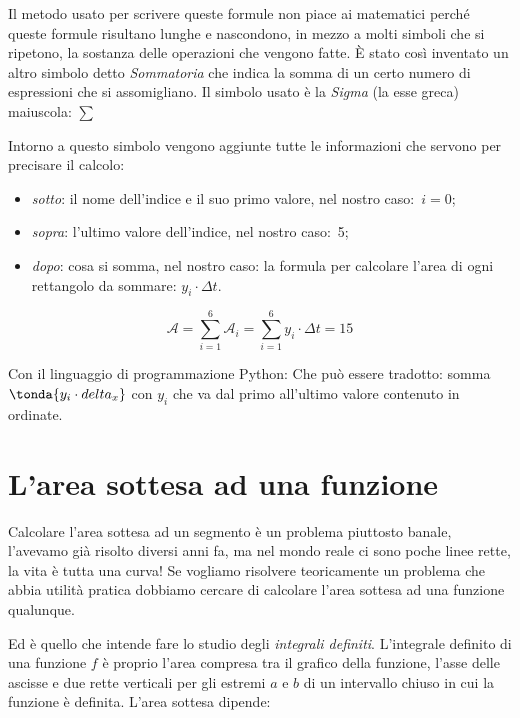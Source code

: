 Il metodo usato per scrivere queste formule non piace ai matematici 
perché queste formule risultano lunghe e nascondono, 
in mezzo a molti simboli che si ripetono, 
la sostanza delle operazioni che vengono fatte. 
È stato così inventato un altro simbolo detto 
\emph{Sommatoria} che indica la somma di un certo numero di espressioni che 
si assomigliano. Il simbolo usato è la \emph{Sigma} (la esse greca) maiuscola:
\(\sum\)

Intorno a questo simbolo vengono aggiunte tutte le informazioni che servono 
per precisare il calcolo:

\begin{itemize} [nosep]
 \item \emph{sotto}: il nome dell'indice e il suo primo valore, nel nostro 
caso:~\(i=0\);
 \item \emph{sopra}: l'ultimo valore dell'indice, nel nostro caso:~5;
 \item \emph{dopo}: cosa si somma, nel nostro caso: la formula per calcolare 
l'area di ogni rettangolo da sommare: \(y_i \cdot \Delta t\).
\end{itemize}

\[\mathcal{A} = \sum_{i=1}^6 \mathcal{A}_i = 
                \sum_{i=1}^6 y_i \cdot \Delta t = 15\]

\ifcoding
Con il linguaggio di programmazione Python:
Che può essere tradotto: somma 
\(\tonda{y_i \cdot delta_x}\) con \(y_i\) che va 
dal primo all'ultimo valore contenuto in ordinate.
\fi

\section{L'area sottesa ad una funzione}
\label{sec:integrali_definiti}

Calcolare l'area sottesa ad un segmento è un problema piuttosto banale, 
l'avevamo già risolto diversi anni fa, ma nel mondo reale ci sono poche 
linee rette, la vita è tutta una curva!
Se vogliamo risolvere teoricamente un problema che abbia utilità pratica 
dobbiamo cercare di calcolare l'area sottesa ad una funzione qualunque.

Ed è quello che intende fare lo studio degli \emph{integrali definiti}.
L'integrale definito di una funzione \(f\) è proprio
l'area compresa tra il grafico della funzione, l'asse delle ascisse 
e due rette verticali per gli estremi \(a\) e \(b\) di un intervallo chiuso 
in cui la funzione è definita.
L'area sottesa dipende:

